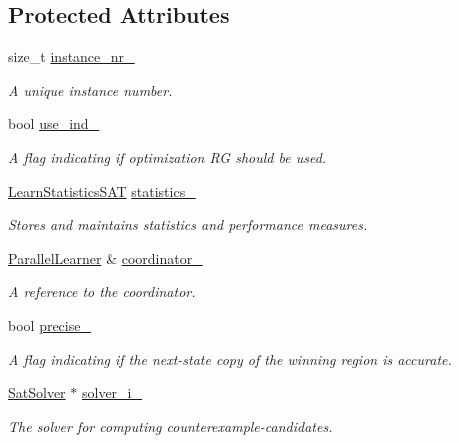 \subsection*{Protected Attributes}
\begin{DoxyCompactItemize}
\item 
size\-\_\-t \hyperlink{classClauseExplorerSAT_ab9ff4163b38a8ce70e07b78ea2e76cc2}{instance\-\_\-nr\-\_\-}
\begin{DoxyCompactList}\small\item\em A unique instance number. \end{DoxyCompactList}\item 
bool \hyperlink{classClauseExplorerSAT_aca59e0b38c8a8fea9cf35d174969c41e}{use\-\_\-ind\-\_\-}
\begin{DoxyCompactList}\small\item\em A flag indicating if optimization R\-G should be used. \end{DoxyCompactList}\item 
\hyperlink{classLearnStatisticsSAT}{Learn\-Statistics\-S\-A\-T} \hyperlink{classClauseExplorerSAT_a1d37eb0233177911835bc073fbe1c224}{statistics\-\_\-}
\begin{DoxyCompactList}\small\item\em Stores and maintains statistics and performance measures. \end{DoxyCompactList}\item 
\hyperlink{classParallelLearner}{Parallel\-Learner} \& \hyperlink{classClauseExplorerSAT_a8909bb332c60d7611763ca5976fbe6f6}{coordinator\-\_\-}
\begin{DoxyCompactList}\small\item\em A reference to the coordinator. \end{DoxyCompactList}\item 
bool \hyperlink{classClauseExplorerSAT_a3edc259c6f39cce098ab18a2dce7f262}{precise\-\_\-}
\begin{DoxyCompactList}\small\item\em A flag indicating if the next-\/state copy of the winning region is accurate. \end{DoxyCompactList}\item 
\hyperlink{classSatSolver}{Sat\-Solver} $\ast$ \hyperlink{classClauseExplorerSAT_a65b5b3d04ff5be8bfec60d3dcf86e4d0}{solver\-\_\-i\-\_\-}
\begin{DoxyCompactList}\small\item\em The solver for computing counterexample-\/candidates. \end{DoxyCompactList}\item 

\end{DoxyCompactItemize}
